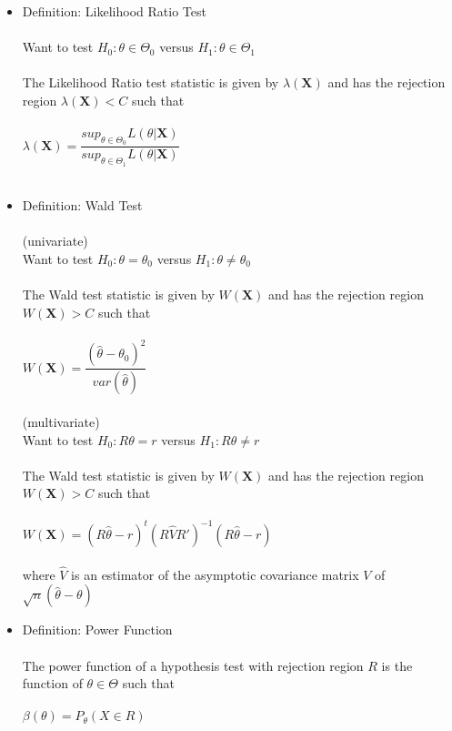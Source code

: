\documentclass{article}
\begin{document}
\begin{itemize}
    \item Definition: Likelihood Ratio Test\\\\
    Want to test $H_0: \theta\in\Theta_0$ versus $H_1: \theta\in\Theta_1$\\\\
    The Likelihood Ratio test statistic is given by $\lambda(\textbf{X})$ and has the rejection region $\lambda(\textbf{X})<C$ such that\\\\
$\lambda(\textbf{X})=\dfrac{sup_{\theta\in\Theta_0}L(\theta|\textbf{X})}{sup_{\theta\in\Theta_1}L(\theta|\textbf{X})}$\\\\
    \item Definition: Wald Test\\\\
    (univariate)\\
    Want to test $H_0: \theta=\theta_0$ versus $H_1: \theta\neq\theta_0$\\\\
    The Wald test statistic is given by $W(\textbf{X})$ and has the rejection region $W(\textbf{X})>C$ such that\\\\
    $W(\textbf{X})=\dfrac{(\hat{\theta}-\theta_0)^2}{var(\hat{\theta})}$\\\\
    (multivariate)\\
    Want to test $H_0:R\theta=r$ versus $H_1:R\theta\neq r$\\\\
    The Wald test statistic is given by $W(\textbf{X})$ and has the rejection region $W(\textbf{X})>C$ such that\\\\
    $W(\textbf{X})=(R\hat{\theta}-r)^t(R\hat{V}R')^{-1}(R\hat{\theta}-r)$\\\\
    where $\hat{V}$ is an estimator of the asymptotic covariance matrix $V$ of $\sqrt{n}(\hat{\theta}-\theta)$
    \item Definition: Power Function\\\\
    The power function of a hypothesis test with rejection region $R$ is the function of $\theta\in\Theta$ such that\\\\
    $\beta(\theta)=P_\theta(X\in R)$
\end{itemize}
\end{document}
